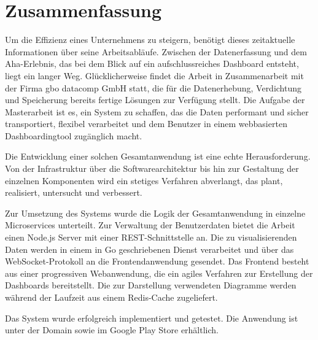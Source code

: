 \chapter*{Zusammenfassung}
\label{chap:zusammenfassung}

Um die Effizienz eines Unternehmens zu steigern, benötigt dieses zeitaktuelle Informationen über seine Arbeitsabläufe.
Zwischen der Datenerfassung und dem Aha-Erlebnis, das bei dem Blick auf ein aufschlussreiches Dashboard entsteht, liegt ein
langer Weg. Glücklicherweise findet die Arbeit in Zusammenarbeit mit der Firma gbo datacomp GmbH statt, die für die
Datenerhebung, Verdichtung und Speicherung bereits fertige Lösungen zur Verfügung stellt. Die Aufgabe der Masterarbeit
ist es, ein System zu schaffen, das die Daten performant und sicher transportiert, flexibel verarbeitet und dem Benutzer
in einem webbasierten Dashboardingtool zugänglich macht.

Die Entwicklung einer solchen Gesamtanwendung ist eine echte Herausforderung. Von der Infrastruktur
über die Softwarearchitektur bis hin zur Gestaltung der einzelnen Komponenten wird ein stetiges
Verfahren abverlangt, das plant, realisiert, untersucht und verbessert.

Zur Umsetzung des Systems wurde die Logik der Gesamtanwendung in einzelne Microservices
unterteilt. Zur Verwaltung der Benutzerdaten bietet die Arbeit einen Node.js Server
mit einer REST-Schnittstelle an. Die zu visualisierenden Daten werden in einem
in Go geschriebenen Dienst verarbeitet und über das WebSocket-Protokoll an die
Frontendanwendung gesendet. Das \mbox{Frontend} besteht aus einer progressiven Webanwendung,
die ein agiles Verfahren zur Erstellung der Dashboards bereitstellt. Die zur Darstellung
verwendeten Diagramme werden während der Laufzeit aus einem Redis-Cache zugeliefert.

Das System wurde erfolgreich implementiert und getestet. Die Anwendung ist unter der Domain 
sowie im Google Play Store erhältlich.
